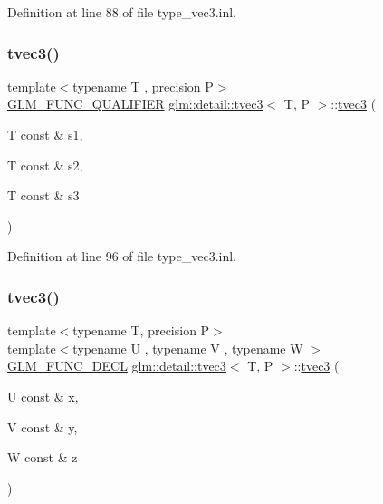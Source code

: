 Definition at line 88 of file type\+\_\+vec3.\+inl.

\mbox{\label{structglm_1_1detail_1_1tvec3_af282d8b360f521784a9a5a5240451aec}} 
\subsubsection{\texorpdfstring{tvec3()}{tvec3()}\hspace{0.1cm}{\footnotesize\ttfamily [6/17]}}
{\footnotesize\ttfamily template$<$typename T , precision P$>$ \\
\hyperlink{setup_8hpp_a33fdea6f91c5f834105f7415e2a64407}{G\+L\+M\+\_\+\+F\+U\+N\+C\+\_\+\+Q\+U\+A\+L\+I\+F\+I\+ER} \hyperlink{structglm_1_1detail_1_1tvec3}{glm\+::detail\+::tvec3}$<$ T, P $>$\+::\hyperlink{structglm_1_1detail_1_1tvec3}{tvec3} (\begin{DoxyParamCaption}\item[{T const \&}]{s1,  }\item[{T const \&}]{s2,  }\item[{T const \&}]{s3 }\end{DoxyParamCaption})}



Definition at line 96 of file type\+\_\+vec3.\+inl.

\mbox{\label{structglm_1_1detail_1_1tvec3_aa1c2ac2585b673f7238017266ba427e9}} 
\subsubsection{\texorpdfstring{tvec3()}{tvec3()}\hspace{0.1cm}{\footnotesize\ttfamily [7/17]}}
{\footnotesize\ttfamily template$<$typename T, precision P$>$ \\
template$<$typename U , typename V , typename W $>$ \\
\hyperlink{setup_8hpp_ab2d052de21a70539923e9bcbf6e83a51}{G\+L\+M\+\_\+\+F\+U\+N\+C\+\_\+\+D\+E\+CL} \hyperlink{structglm_1_1detail_1_1tvec3}{glm\+::detail\+::tvec3}$<$ T, P $>$\+::\hyperlink{structglm_1_1detail_1_1tvec3}{tvec3} (\begin{DoxyParamCaption}\item[{U const \&}]{x,  }\item[{V const \&}]{y,  }\item[{W const \&}]{z }\end{DoxyParamCaption})}



